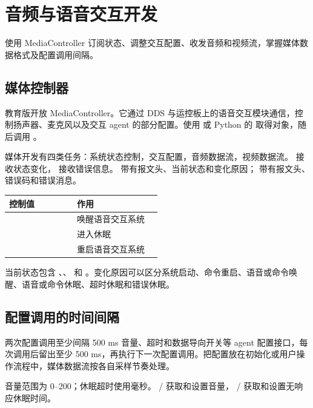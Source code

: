 \chapter{音频与语音交互开发}

\label{chap:media}
\begin{intro}
使用 MediaController 订阅状态、调整交互配置、收发音频和视频流，掌握媒体数据格式及配置调用间隔。
\end{intro}
\section{媒体控制器}
教育版开放 MediaController。它通过 DDS 与运控板上的语音交互模块通信，控制扬声器、麦克风以及交互 agent 的部分配置。使用  或 Python 的  取得对象，随后调用 。

媒体开发有四类任务：系统状态控制，交互配置，音频数据流，视频数据流。 接收状态变化， 接收错误信息。 带有报文头、当前状态和变化原因； 带有报文头、错误码和错误消息。

\begingroup\small\renewcommand{\arraystretch}{1.15}
\begin{longtable}{@{}P{0.4\linewidth}P{0.5\linewidth}@{}}
\toprule
\textbf{控制值} & \textbf{作用} \\
\midrule\endhead
{} & 唤醒语音交互系统 \\
 & 进入休眠 \\
 & 重启语音交互系统 \\
\bottomrule\end{longtable}\endgroup

当前状态包含 、、 和 。变化原因可以区分系统启动、命令重启、语音或命令唤醒、语音或命令休眠、超时休眠和错误休眠。
\section{配置调用的时间间隔}
\begin{remark}{两次配置调用至少间隔 500 ms}
音量、超时和数据导向开关等 agent 配置接口，每次调用后留出至少 500 ms，再执行下一次配置调用。把配置放在初始化或用户操作流程中，媒体数据流按各自采样节奏处理。
\end{remark}
音量范围为 0--200；休眠超时使用毫秒。 /  获取和设置音量， /  获取和设置无响应休眠时间。

